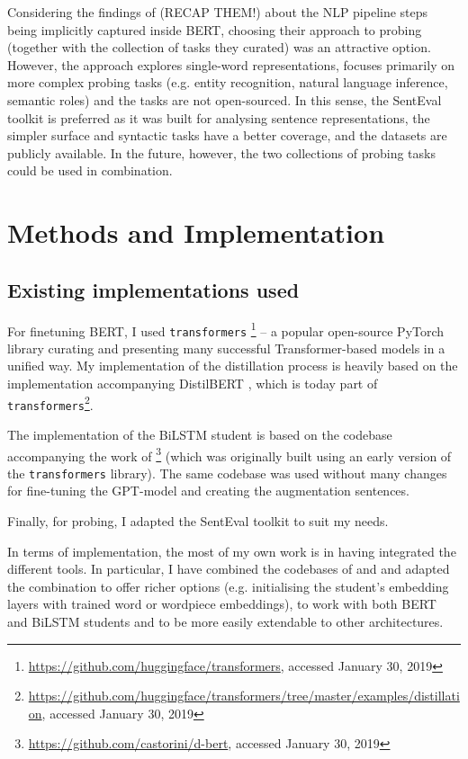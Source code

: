 \documentclass[bsc,frontabs,twoside,singlespacing,parskip,deptreport]{infthesis}
\begin{document}
{{    Considering the findings of \citet{Tenney_2019b} (RECAP THEM!) about the NLP pipeline steps being implicitly captured inside BERT, choosing their approach to probing (together with the collection of tasks they curated) was an attractive option. However, the approach explores single-word representations, focuses primarily on more complex probing tasks (e.g. entity recognition, natural language inference, semantic roles) and the tasks are not open-sourced. In this sense, the SentEval toolkit is preferred as it was built for analysing sentence representations, the simpler surface and syntactic tasks have a better coverage, and the datasets are publicly available. In the future, however, the two collections of probing tasks could be used in combination.
  }
}

\chapter{Methods and Implementation}{
  \label{chap:methods-implementation}
  \section{Existing implementations used}{
    For finetuning BERT, I used \verb|transformers| \citep{Wolf_2019}\footnote{\url{https://github.com/huggingface/transformers}, accessed January 30, 2019} -- a popular open-source PyTorch library curating and presenting many successful Transformer-based models in a unified way.
    My implementation of the distillation process is heavily based on the implementation accompanying DistilBERT \citep{Sanh_2019}, which is today part of \verb|transformers|\footnote{\url{https://github.com/huggingface/transformers/tree/master/examples/distillation}, accessed January 30, 2019}.

    The implementation of the BiLSTM student is based on the codebase accompanying the work of \citet{Tang_2019b}\footnote{\url{https://github.com/castorini/d-bert}, accessed January 30, 2019} (which was originally built using an early version of the \verb|transformers| library). The same codebase was used without many changes for fine-tuning the GPT-model and creating the augmentation sentences.

    Finally, for probing, I adapted the SentEval toolkit \citep{SentEval-paper} to suit my needs.

    In terms of implementation, the most of my own work is in having integrated the different tools. In particular, I have combined the codebases of \citet{Sanh_2019} and \citet{Tang_2019b} and adapted the combination to offer richer options (e.g. initialising the student's embedding layers with trained word or wordpiece embeddings), to work with both BERT and BiLSTM students and to be more easily extendable to other architectures.
  }
}
\end{document}
